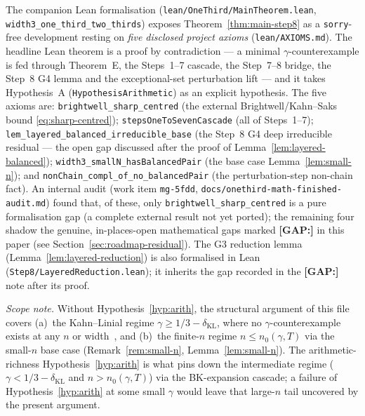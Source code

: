 \begin{remark}\label{rem:headline-lean-restatement}
The companion Lean formalisation
(\texttt{lean/OneThird/MainTheorem.lean}, \texttt{width3\_one\_third\_two\_thirds})
exposes Theorem~\ref{thm:main-step8} as a \texttt{sorry}-free
development resting on \emph{five disclosed project axioms}
(\texttt{lean/AXIOMS.md}). The headline Lean theorem is a proof by
contradiction --- a minimal $\gamma$-counter\-example is fed through
Theorem~E, the Steps~1--7 cascade, the Step~7--8 bridge, the Step~8
G4 lemma and the exceptional-set perturbation lift --- and it takes
Hypothesis~A (\texttt{HypothesisArithmetic}) as an explicit
hypothesis. The five axioms are: \texttt{brightwell\_sharp\_centred}
(the external Brightwell/Kahn--Saks bound \eqref{eq:sharp-centred});
\texttt{stepsOneToSevenCascade} (all of Steps~1--7);
\texttt{lem\_layered\_balanced\_irreducible\_base} (the Step~8 G4
deep irreducible residual --- the open gap discussed after the proof
of Lemma~\ref{lem:layered-balanced});
\texttt{width3\_smallN\_hasBalancedPair} (the base case
Lemma~\ref{lem:small-n}); and
\texttt{nonChain\_compl\_of\_no\_balancedPair} (the perturbation-step
non-chain fact). An internal audit (work item \texttt{mg-5fdd},
\texttt{docs/onethird-math-finished-audit.md}) found that, of these,
only \texttt{brightwell\_sharp\_centred} is a pure formalisation gap
(a complete external result not yet ported); the remaining four
shadow the genuine, in-places-open mathematical gaps marked
\textbf{[GAP:]} in this paper (see
Section~\ref{sec:roadmap-residual}). The G3 reduction lemma
(Lemma~\ref{lem:layered-reduction}) is also formalised in Lean
(\texttt{Step8/LayeredReduction.lean}); it inherits the gap recorded
in the \textbf{[GAP:]} note after its proof.
\end{remark}

\medskip\noindent\emph{Scope note.} Without
Hypothesis~\ref{hyp:arith}, the structural argument of this file
covers (a)~the Kahn--Linial regime $\gamma \ge 1/3 -
\delta_{\mathrm{KL}}$, where no $\gamma$-counter\-example exists at
any $n$ or width~\cite{KahnLinial1991}, and (b)~the finite-$n$
regime $n \le n_0(\gamma, T)$ via the small-$n$ base case
(Remark~\ref{rem:small-n}, Lemma~\ref{lem:small-n}). The
arithmetic-richness Hypothesis~\ref{hyp:arith} is what pins down
the intermediate regime ($\gamma < 1/3 - \delta_{\mathrm{KL}}$ and
$n > n_0(\gamma, T)$) via the BK-expansion cascade; a failure of
Hypothesis~\ref{hyp:arith} at some small $\gamma$ would leave that
large-$n$ tail uncovered by the present argument.

